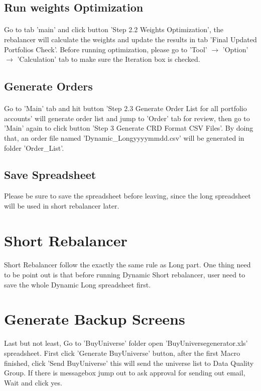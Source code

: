 \documentclass[12pt,letterpaper,twoside]{article}
\begin{document}
\subsection{Run weights Optimization}\label{opt}
\paragraph{}Go to tab 'main' and click button 'Step 2.2 Weights Optimization', the rebalancer will calculate the weights and update the results in tab 'Final Updated Portfolios Check'. {\color{blue}Before running optimization, please go to 'Tool' $\rightarrow$ 'Option' $\rightarrow$ 'Calculation' tab to make sure the {\color{red}Iteration} box is checked.}
\subsection{Generate Orders}\label{order}
\paragraph{}Go to 'Main' tab and hit button 'Step 2.3 Generate Order List for all portfolio accounts' will generate order list and jump to 'Order' tab for review, then go to 'Main' again to click button 'Step 3 Generate CRD Format CSV Files'. By doing that, an order file named 'Dynamic\_Longyyyymmdd.csv' will be generated in folder 'Order\_List'.
\subsection{Save Spreadsheet}
Please be sure to save the spreadsheet before leaving, since the long spreadsheet will be used in short rebalancer later.
\section{Short Rebalancer}\label{short}
\paragraph{}Short Rebalancer follow the exactly the same rule as Long part. One thing need to be point out is that before running Dynamic Short rebalancer, user need to save the whole Dynamic Long spreadsheet first.

\section{Generate Backup Screens}
Last but not least, Go to 'BuyUniverse' folder open 'BuyUniversegenerator.xls' spreadsheet. First click 'Generate BuyUniverse' button, after the first Macro finished, click 'Send BuyUniverse' this will send the universe list to Data Quality Group. If there is messagebox jump out to ask approval for sending out email, Wait and click yes.
\end{document}

